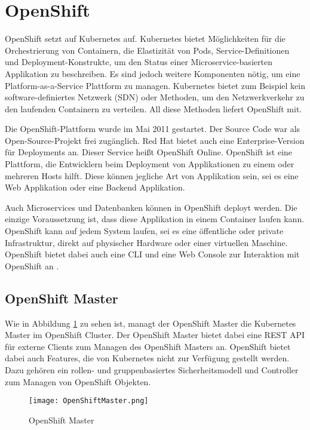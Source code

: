 \section{OpenShift}
OpenShift setzt auf Kubernetes auf. Kubernetes bietet Möglichkeiten für die Orchestrierung von Containern, die Elastizität von Pods, Service-Definitionen und Deployment-Konstrukte, um den Status einer Microservice-basierten Applikation zu beschreiben. Es sind jedoch weitere Komponenten nötig, um eine Platform-as-a-Service Plattform zu managen. Kubernetes bietet zum Beispiel kein software-definiertes Netzwerk (SDN) oder Methoden, um den Netzwerkverkehr zu den laufenden Containern zu verteilen. 
All diese Methoden liefert OpenShift mit. 

Die OpenShift-Plattform wurde im Mai 2011 gestartet. Der Source Code war als Open-Source-Projekt frei zugänglich. Red Hat bietet auch eine Enterprise-Version für Deployments an. Dieser Service heißt OpenShift Online.
OpenShift ist eine Plattform, die Entwicklern beim Deployment von Applikationen zu einem oder mehreren Hosts hilft. Diese können jegliche Art von Applikation sein, sei es eine Web Applikation oder eine Backend Applikation. 

Auch Microservices und Datenbanken können in OpenShift deployt werden. Die einzige Voraussetzung ist, dass diese Applikation in einem Container laufen kann.
OpenShift kann auf jedem System laufen, sei es eine öffentliche oder private Infrastruktur, direkt auf physischer Hardware oder einer virtuellen Maschine.
OpenShift bietet dabei auch eine CLI und eine Web Console zur Interaktion mit OpenShift an \cite{DeployingToOpenShift}.


\subsection{OpenShift Master}
Wie in Abbildung \ref{fig:OpenShiftMaster} zu sehen ist, managt der OpenShift Master die Kubernetes Master im OpenShift Cluster. Der OpenShift Master bietet dabei eine REST API für externe Clients zum Managen des OpenShift Masters an. OpenShift bietet dabei auch Features, die von Kubernetes nicht zur Verfügung gestellt werden. Dazu gehören ein rollen- und gruppenbasiertes Sicherheitsmodell und Controller zum Managen von OpenShift Objekten.

\begin{figure}[H]
	\begin{center}
		\texttt{[image: OpenShiftMaster.png]}
		\caption[OpenShift Master]{OpenShift Master \cite{OpenShiftOnline}}
		\label{fig:OpenShiftMaster}
	\end{center}
\end{figure}


